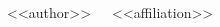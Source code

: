 \documentclass[letterpaper,12pt]{article}
\begin{document}
~~~\textmd{\small{<<author>>}}~~~\footnotesize{<<affiliation>>}
\vspace{-5pt}
\begin{multicols}{2}
\small


\begingroup
\setlength\bibitemsep{0pt}
\printbibliography
\endgroup
\end{multicols}
\end{document}
